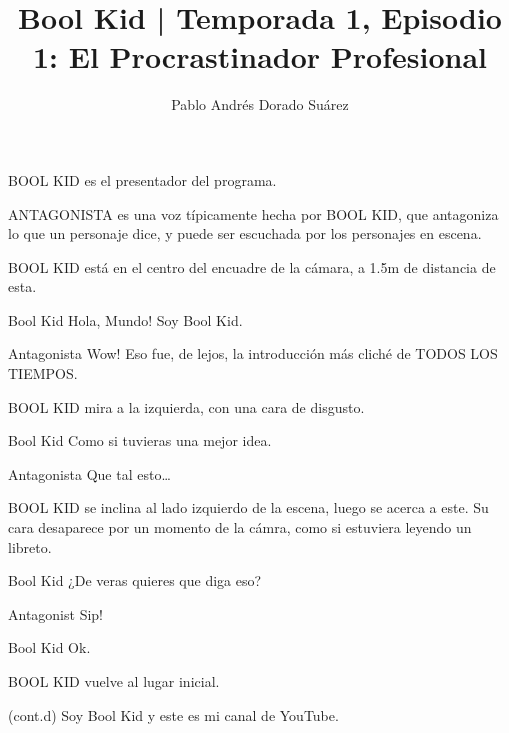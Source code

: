 \documentclass{screenplay}[2018/01/07]
\title{Bool Kid | Temporada 1, Episodio 1: El Procrastinador Profesional}
\author{Pablo Andrés Dorado Suárez}
\begin{document}
    \coverpage

    \fadein
    BOOL KID es el presentador del programa.

    ANTAGONISTA es una voz típicamente hecha por BOOL KID, que antagoniza lo que
    un personaje dice, y puede ser escuchada por los personajes en escena.



    BOOL KID está en el centro del encuadre de la cámara, a 1.5m de distancia de
    esta.

    \begin{dialogue}{Bool Kid}
        Hola, Mundo! Soy Bool Kid.
    \end{dialogue}

    \begin{dialogue}{Antagonista}
        Wow! Eso fue, de lejos, la introducción más cliché de TODOS LOS TIEMPOS.
    \end{dialogue}

    BOOL KID mira a la izquierda, con una cara de disgusto.

    \begin{dialogue}{Bool Kid}
        Como si tuvieras una mejor idea.
    \end{dialogue}

    \begin{dialogue}{Antagonista}
        Que tal esto\dots
    \end{dialogue}

    BOOL KID se inclina al lado izquierdo de la escena, luego se acerca a este.
    Su cara desaparece por un momento de la cámra, como si estuviera leyendo un
    libreto.

    \begin{dialogue}{Bool Kid}
        ¿De veras quieres que diga eso?
    \end{dialogue}

    \begin{dialogue}{Antagonist}
        Sip!
    \end{dialogue}

    \begin{dialogue}[sighing]{Bool Kid}
        Ok.
    \end{dialogue}


    BOOL KID vuelve al lugar inicial.

    \begin{dialogue}{(cont.d)}
        Soy Bool Kid y este es mi canal de YouTube.
    \end{dialogue}
\end{document}
